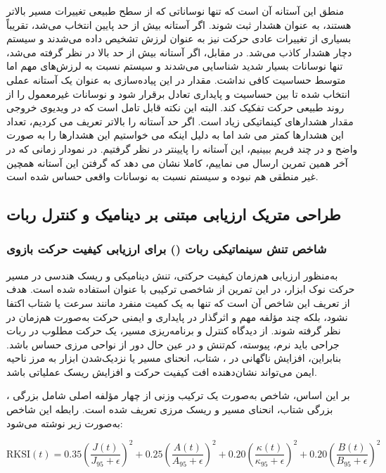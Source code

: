 \documentclass{article}
\begin{document}
منطق این آستانه آن است که تنها نوساناتی که از سطح طبیعی تغییرات مسیر بالاتر هستند، به عنوان هشدار ثبت شوند. اگر آستانه بیش از حد پایین انتخاب می‌شد، تقریباً بسیاری از تغییرات عادی حرکت نیز به عنوان لرزش تشخیص داده می‌شدند و سیستم دچار هشدار کاذب می‌شد. در مقابل، اگر آستانه بیش از حد بالا در نظر گرفته می‌شد، تنها نوسانات بسیار شدید شناسایی می‌شدند و سیستم نسبت به لرزش‌های مهم اما متوسط حساسیت کافی نداشت. مقدار  در این پیاده‌سازی به عنوان یک آستانه عملی انتخاب شده تا بین حساسیت و پایداری تعادل برقرار شود و نوسانات غیرمعمول را از روند طبیعی حرکت تفکیک کند. البته این نکته قابل تامل است که در ویدیوی خروجی مقدار هشدارهای کینماتیکی زیاد است. اگر حد آستانه را بالاتر تعریف می کردیم، تعداد این هشدارها کمتر می شد اما به دلیل اینکه می خواستیم این هشدارها را به صورت واضح و در چند فریم ببینیم، این آستانه را پایینتر در نظر گرفتیم. در نمودار زمانی که در آخر همین تمرین ارسال می نماییم، کاملا نشان می دهد که گرفتن این آستانه همچین غیر منطقی هم نبوده و سیستم نسبت به نوسانات واقعی حساس شده است.

\subsection{طراحی متریک ارزیابی مبتنی بر دینامیک و کنترل ربات}

\subsubsection{شاخص تنش سینماتیکی ربات () برای ارزیابی کیفیت حرکت بازوی }

به‌منظور ارزیابی هم‌زمان کیفیت حرکتی، تنش دینامیکی و ریسک هندسی در مسیر حرکت نوک ابزار، در این تمرین از شاخصی ترکیبی با عنوان  استفاده شده است. هدف از تعریف این شاخص آن است که تنها به یک کمیت منفرد مانند سرعت یا شتاب اکتفا نشود، بلکه چند مؤلفه مهم و اثرگذار در پایداری و ایمنی حرکت به‌صورت هم‌زمان در نظر گرفته شوند. از دیدگاه کنترل و برنامه‌ریزی مسیر، یک حرکت مطلوب در ربات جراحی باید نرم، پیوسته، کم‌تنش و در عین حال دور از نواحی مرزی حساس باشد. بنابراین، افزایش ناگهانی در ، شتاب، انحنای مسیر یا نزدیک‌شدن ابزار به مرز ناحیه ایمن می‌تواند نشان‌دهنده افت کیفیت حرکت و افزایش ریسک عملیاتی باشد.

بر این اساس، شاخص  به‌صورت یک ترکیب وزنی از چهار مؤلفه اصلی شامل بزرگی ، بزرگی شتاب، انحنای مسیر و ریسک مرزی تعریف شده است. رابطه این شاخص به‌صورت زیر نوشته می‌شود:

\[
\mathrm{RKSI}(t)
=
0.35\left(\frac{J(t)}{J_{95}+\epsilon}\right)^2
+
0.25\left(\frac{A(t)}{A_{95}+\epsilon}\right)^2
+
0.20\left(\frac{\kappa(t)}{\kappa_{95}+\epsilon}\right)^2
+
0.20\left(\frac{B(t)}{B_{95}+\epsilon}\right)^2
\]
\end{document}
